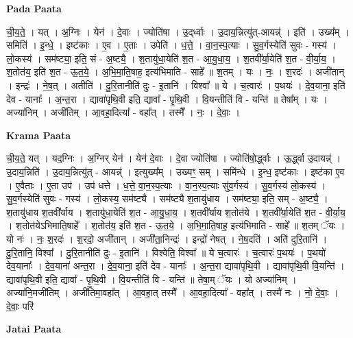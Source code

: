 \documentclass[17pt]{extarticle}
\begin{document}
\textbf{Pada Paata} \newline

ची॒य॒ते॒ । यत् । अ॒ग्निः । येन॑ । दे॒वाः । ज्योति॑षा । उ॒द्‌र्ध्वाः । उ॒दाय॒न्नित्यु॑त्-आयन्न्॑ । इति॑ । उख्य᳚म् । समिति॑ । इ॒न्धे॒ । इष्ट॑काः । ए॒व । ए॒ताः । उपेति॑ । ध॒त्ते॒ । वा॒न॒स्प॒त्याः । सु॒व॒र्गस्येति॑ सुवः - गस्य॑ । लो॒कस्य॑ । सम॑ष्ट्या॒ इति॒ सं - अ॒ष्ट्यै॒ । श॒तायु॑धा॒येति॑ श॒त - आ॒यु॒धा॒य॒ । श॒तवी᳚र्या॒येति॑ श॒त - वी॒र्या॒य॒ । श॒तोत॑य॒ इति॑ श॒त - ऊ॒त॒ये॒ । अ॒भि॒मा॒ति॒षाह॒ इत्य॑भिमाति -   साहे᳚ ॥ श॒तम् । यः । नः॒ । श॒रदः॑ । अजी॑तान् । इन्द्रः॑ । ने॒ष॒त् । अतीति॑ । दु॒रि॒तानीति॑ दुः - इ॒तानि॑ । विश्वा᳚ ॥ ये । च॒त्वारः॑ । प॒थयः॑ । दे॒व॒याना॒ इति॑ देव - यानाः᳚ । अ॒न्त॒रा । द्यावा॑पृथि॒वी इति॒ द्यावा᳚ - पृ॒थि॒वी । वि॒यन्तीति॑ वि - यन्ति॑ ॥ तेषा᳚म् । यः । अज्या॑निम् । अजी॑तिम् । आ॒वहा॒दित्या᳚ - वहा᳚त् । तस्मै᳚ । नः॒ । दे॒वाः॒ ।  \newline


\textbf{Krama Paata} \newline

ची॒य॒ते॒ यत् । यद॒ग्निः । अ॒ग्निर् येन॑ । येन॑ दे॒वाः । दे॒वा ज्योति॑षा । ज्योति॑षो॒र्द्ध्वाः । ऊ॒र्द्ध्वा उ॒दायन्न्॑ । उ॒दाय॒न्निति॑ । उ॒दाय॒न्नित्यु॑त् - आयन्न्॑ । इत्युख्य᳚म् । उख्यꣳ॒॒ सम् । समि॑न्धे । इ॒न्ध॒ इष्ट॑काः । इष्ट॑का ए॒व । ए॒वैताः । ए॒ता उप॑ । उप॑ धत्ते । ध॒त्ते॒ वा॒न॒स्प॒त्याः । वा॒न॒स्प॒त्याः सु॑व॒र्गस्य॑ । सु॒व॒र्गस्य॑ लो॒कस्य॑ । सु॒व॒र्गस्येति॑ सुवः - गस्य॑ । लो॒कस्य॒ सम॑ष्ट्यै । सम॑ष्ट्यै श॒तायु॑धाय । सम॑ष्ट्या॒ इति॒ सम् - अ॒ष्ट्यै॒ । श॒तायु॑धाय श॒तवी᳚र्याय । श॒तायु॑धा॒येति॑ श॒त - आ॒यु॒धा॒य॒ । श॒तवी᳚र्याय श॒तोत॑ये । श॒तवी᳚र्या॒येति॑ श॒त - वी॒र्या॒य॒ । श॒तोत॑येऽभिमाति॒षाहे᳚ । श॒तोत॑य॒ इति॑ श॒त - ऊ॒त॒ये॒ । अ॒भि॒मा॒ति॒षाह॒ इत्य॑भिमाति - साहे᳚ ॥ श॒तम् ॅयः । यो नः॑ । नः॒ श॒रदः॑ । श॒रदो॒ अजी॑तान् । अजी॑ता॒निन्द्रः॑ । इन्द्रो॑ नेषत् । ने॒ष॒दति॑ । अति॑ दुरि॒तानि॑ । दु॒रि॒तानि॒ विश्वा᳚ । दु॒रि॒तानीति॑ दुः - इ॒तानि॑ । विश्वेति॒ विश्वा᳚ ॥ ये च॒त्वारः॑ । च॒त्वारः॑ प॒थयः॑ । प॒थयो॑ देव॒यानाः᳚ । दे॒व॒याना॑ अन्त॒रा । दे॒व॒याना॒ इति॑ देव - यानाः᳚ । अ॒न्त॒रा द्यावा॑पृथि॒वी । द्यावा॑पृथि॒वी वि॒यन्ति॑ । द्यावा॑पृथि॒वी इति॒ द्यावा᳚ - पृ॒थि॒वी । वि॒यन्तीति॑ वि - यन्ति॑ ॥ तेषा॒म् ॅयः । यो अज्या॑निम् । अज्या॑नि॒मजी॑तिम् । अजी॑तिमा॒वहा᳚त् । आ॒वहा॒त् तस्मै᳚ । आ॒वहा॒दित्या᳚ - वहा᳚त् । तस्मै॑ नः । नो॒ दे॒वाः॒ । दे॒वाः॒ परि॑ \newline

\textbf{Jatai Paata} \newline
\end{document}
